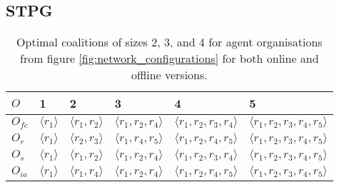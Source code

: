 \documentclass{llncs}
\newcommand{\LD}{\langle}
\newcommand{\RD}{\rangle}
\begin{document}
\begin{table}

 \centering


\caption{Maximum task completion probabilities for optimal agent organisations using algorithm \ref{alg:join_team_nondet}'s online and offline versions (see algorithm \ref{alg:main_process}). Results obtained by model checking PCTL formulae on MDP model.}
\end{table}

\clearpage

\subsection{STPG}

\begin{table}
 \centering
 \begin{tabular}{ | l | l | l | l | l | l |}
    \hline
    $O$ & 1& 2 & 3 & 4 & 5 \\ \hline
    $O_{fc}$ & $\LD r_1 \RD$ & $\LD r_1, r_2 \RD$ & $\LD r_1, r_2, r_4 \RD$ & $\LD r_1, r_2, r_3, r_4 \RD$  & $\LD r_1, r_2, r_3, r_4, r_5 \RD$ \\ \hline
    $O_r$ & $\LD r_1 \RD$  & $\LD r_2, r_3 \RD$ & $\LD r_1, r_4, r_5 \RD$ & $\LD r_1, r_2, r_4, r_5 \RD$  & $\LD r_1, r_2, r_3, r_4, r_5 \RD$\\ \hline
    $O_s$ & $\LD r_1 \RD$  & $\LD r_1, r_2 \RD$ & $\LD r_1, r_2, r_4 \RD$ & $\LD r_1, r_2, r_3, r_4 \RD$  & $\LD r_1, r_2, r_3, r_4, r_5 \RD$\\ \hline
    $O_{ia}$ & $\LD r_1 \RD$  & $\LD r_1, r_4 \RD$ & $\LD r_1, r_2, r_4 \RD$ & $\LD r_1, r_2, r_4, r_5 \RD$  & $\LD r_1, r_2, r_3, r_4, r_5 \RD$\\ \hline
\end{tabular}
\caption{Optimal coalitions of sizes 2, 3, and 4 for agent organisations from figure \ref{fig:network_configurations} for both online and offline versions.}
\label{tab:optimal_coalitions}
\end{table}
\end{document}
